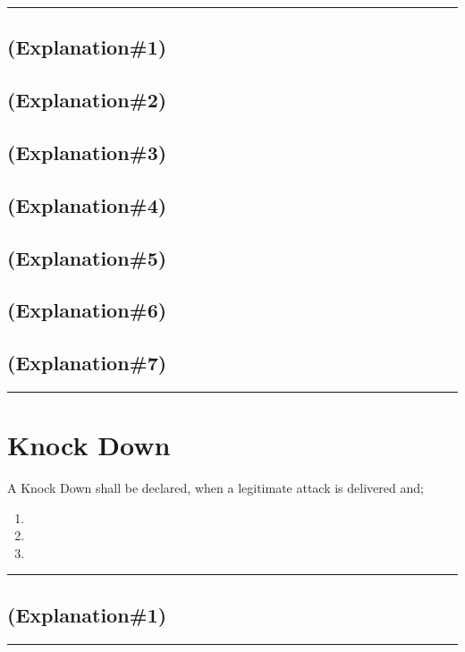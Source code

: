 \documentclass[draft]{report}
\newenvironment{expl}[0]%
  {\rule{\textwidth}{.2pt}\footnotesize}%
  {\rule{\textwidth}{.2pt}\normalsize}
\begin{document}
\begin{expl}
\section{(Explanation\#1)}

\section{(Explanation\#2)}

\section{(Explanation\#3)}

\section{(Explanation\#4)}

\section{(Explanation\#5)}

\section{(Explanation\#6)}

\section{(Explanation\#7)}

\end{expl}

\chapter{Knock Down}\label{knock-down}

A Knock Down shall be declared, when a legitimate attack is delivered and;

\begin{enumerate}
\item

\item

\item

\end{enumerate}

\begin{expl}
\section{(Explanation\#1)}

\end{expl}
\end{document}
